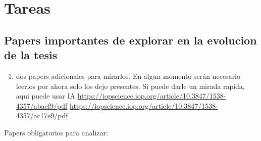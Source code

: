 \chapter*{Tareas}


\section*{Papers importantes de explorar en la evolucion de la tesis}

\begin{enumerate}
        \item dos papers adicionales para mirarlos. En algun momento serán necesario leerlos por ahora solo los dejo presentes. Si puede darle un mirada rapida, aqui puede usar IA
    \url{https://iopscience.iop.org/article/10.3847/1538-4357/abaef9/pdf}
    \url{https://iopscience.iop.org/article/10.3847/1538-4357/ac17e9/pdf}
\end{enumerate}


\newpage

Papers obligatorios para analizar:

